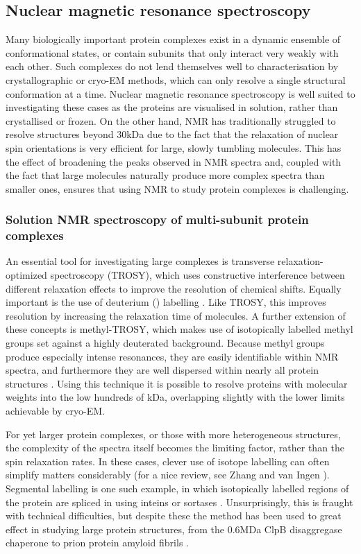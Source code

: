 \documentclass[a4paper,11pt,twoside,openright]{scrbook}
\begin{document}
\subsection{Nuclear magnetic resonance spectroscopy}
Many biologically important protein complexes exist in a dynamic ensemble of
conformational states, or contain subunits that only interact very weakly with
each other. Such complexes do not lend themselves well to characterisation by
crystallographic or cryo-EM methods, which can only resolve a single structural
conformation at a time. Nuclear magnetic resonance spectroscopy is well suited
to investigating these cases as the proteins are visualised in solution, rather
than crystallised or frozen. On the other hand, NMR has traditionally struggled
to resolve structures beyond 30kDa due to the fact that the relaxation of
nuclear spin orientations is very efficient for large, slowly tumbling
molecules. This has the effect of broadening the peaks observed in NMR spectra
and, coupled with the fact that large molecules naturally produce more complex
spectra than smaller ones, ensures that using NMR to study protein complexes is
challenging.

\subsubsection{Solution NMR spectroscopy of multi-subunit protein complexes}
An essential tool for investigating large complexes is transverse
relaxation-optimized spectroscopy \cite{Pervushin1997} (TROSY), which uses
constructive interference between different relaxation effects to improve the
resolution of chemical shifts. Equally important is the use of deuterium
() labelling \cite{Sattler1996}. Like TROSY, this improves resolution
by increasing the relaxation time of molecules. A further extension of these
concepts is methyl-TROSY, which makes use of isotopically labelled
 methyl groups set against a highly deuterated background.
Because methyl groups produce especially intense resonances, they are easily
identifiable within NMR spectra, and furthermore they are well dispersed within
nearly all protein structures \cite{Ollerenshaw2003}. Using this technique it is
possible to resolve proteins with molecular weights into the low hundreds of
kDa, overlapping slightly with the lower limits achievable by cryo-EM.

For yet larger protein complexes, or those with more heterogeneous structures,
the complexity of the spectra itself becomes the limiting factor, rather than
the spin relaxation rates. In these cases, clever use of isotope labelling can
often simplify matters considerably (for a nice review, see Zhang and van Ingen
\cite{Zhang2016}). Segmental labelling is one such example, in which
isotopically labelled regions of the protein are spliced in using inteins or
sortases \cite{Liu2009a}. Unsurprisingly, this is fraught with technical
difficulties, but despite these the method has been used to great effect in
studying large protein structures, from the 0.6MDa ClpB disaggregase chaperone
\cite{Rosenzweig2015} to prion protein amyloid fibrils \cite{Frederick2017}.
\end{document}
